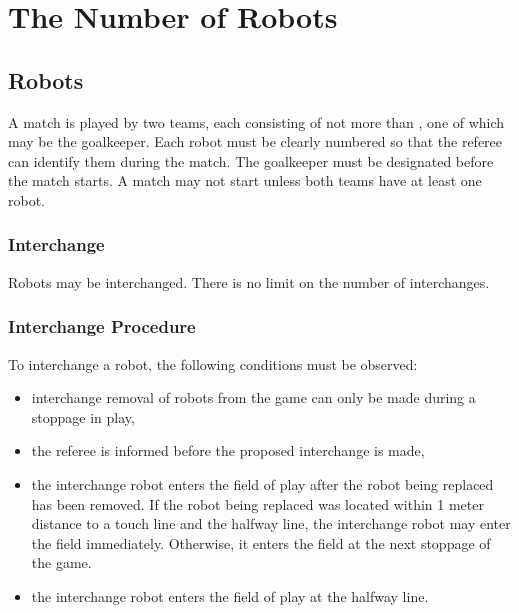\section{The Number of Robots}\label{sec:number-of-robots}

\subsection{Robots}
A match is played by two teams, each consisting of not more than  , one of which may be the goalkeeper.
Each robot must be clearly numbered so that the referee can identify them during the match.
The goalkeeper must be designated before the match starts.
A match may not start unless both teams have at least one robot.

\subsubsection{Interchange}\label{subsubsec:number-of-robots-interchange}
Robots may be interchanged.
There is no limit on the number of interchanges.

\subsubsection{Interchange Procedure}
To interchange a robot, the following conditions must be observed:
\begin{itemize}
\item interchange removal of robots from the game can only be made during a stoppage in play,
\item the referee is informed before the proposed interchange is made,
\item the interchange robot enters the field of play after the robot being replaced has been removed.
If the robot being replaced was located within 1 meter distance to a touch line and the halfway line, the interchange robot may enter the field immediately. Otherwise, it enters the field at the next stoppage of the game.
\item the interchange robot enters the field of play at  the halfway line.
\end{itemize}

